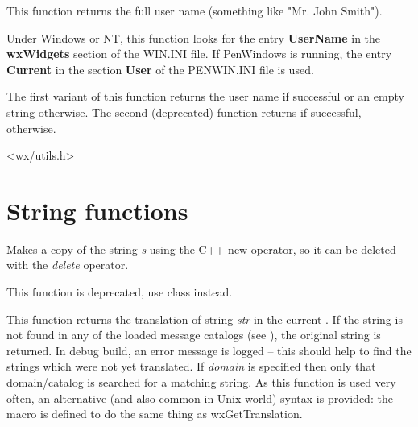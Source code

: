 

This function returns the full user name (something like "Mr. John Smith").

Under Windows or NT, this function looks for the entry {\bf UserName}\rtfsp
in the {\bf wxWidgets} section of the WIN.INI file. If PenWindows
is running, the entry {\bf Current} in the section {\bf User} of
the PENWIN.INI file is used.

The first variant of this function returns the user name if successful or an
empty string otherwise. The second (deprecated) function returns \true
if successful, \false otherwise.




<wx/utils.h>



\section{String functions}\label{stringfunctions}


\label{copystring}


Makes a copy of the string {\it s} using the C++ new operator, so it can be
deleted with the {\it delete} operator.

This function is deprecated, use  class instead.


\label{wxgettranslation}



This function returns the translation of string {\it str} in the current
. If the string is not found in any of the loaded
message catalogs (see ), the
original string is returned. In debug build, an error message is logged -- this
should help to find the strings which were not yet translated.  If
{\it domain} is specified then only that domain/catalog is searched
for a matching string.  As this function
is used very often, an alternative (and also common in Unix world) syntax is
provided: the  macro is defined to do the same thing
as wxGetTranslation.

